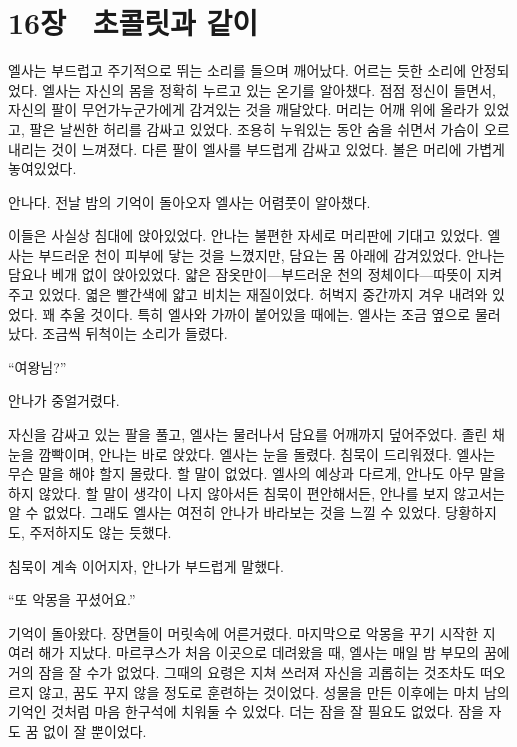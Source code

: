 ﻿

\chapter[16장  초콜릿과 같이][16장\hspace*{.5em}초콜릿과 같이]{16장 \ 초콜릿과 같이}



엘사는 부드럽고 주기적으로 뛰는 소리를 들으며 깨어났다. 어르는 듯한 소리에 안정되었다. 엘사는 자신의 몸을 정확히 누르고 있는 온기를 알아챘다. 점점 정신이 들면서, 자신의 팔이 무언가 누군가에게 감겨있는 것을 깨달았다. 머리는 어깨 위에 올라가 있었고, 팔은 날씬한 허리를 감싸고 있었다. 조용히 누워있는 동안 숨을 쉬면서 가슴이 오르내리는 것이 느껴졌다. 다른 팔이 엘사를 부드럽게 감싸고 있었다. 볼은 머리에 가볍게 놓여있었다.

안나다. 전날 밤의 기억이 돌아오자 엘사는 어렴풋이 알아챘다.

이들은 사실상 침대에 앉아있었다. 안나는 불편한 자세로 머리판에 기대고 있었다. 엘사는 부드러운 천이 피부에 닿는 것을 느꼈지만, 담요는 몸 아래에 감겨있었다. 안나는 담요나 베개 없이 앉아있었다. 얇은 잠옷만이—부드러운 천의 정체이다—따뜻이 지켜주고 있었다. 엷은 빨간색에 얇고 비치는 재질이었다. 허벅지 중간까지 겨우 내려와 있었다. 꽤 추울 것이다. 특히 엘사와 가까이 붙어있을 때에는. 엘사는 조금 옆으로 물러났다. 조금씩 뒤척이는 소리가 들렸다.

``여왕님?''

안나가 중얼거렸다.

자신을 감싸고 있는 팔을 풀고, 엘사는 물러나서 담요를 어깨까지 덮어주었다. 졸린 채 눈을 깜빡이며, 안나는 바로 앉았다. 엘사는 눈을 돌렸다. 침묵이 드리워졌다. 엘사는 무슨 말을 해야 할지 몰랐다. 할 말이 없었다. 엘사의 예상과 다르게, 안나도 아무 말을 하지 않았다. 할 말이 생각이 나지 않아서든 침묵이 편안해서든, 안나를 보지 않고서는 알 수 없었다. 그래도 엘사는 여전히 안나가 바라보는 것을 느낄 수 있었다. 당황하지도, 주저하지도 않는 듯했다.

침묵이 계속 이어지자, 안나가 부드럽게 말했다.

``또 악몽을 꾸셨어요.''

기억이 돌아왔다. 장면들이 머릿속에 어른거렸다. 마지막으로 악몽을 꾸기 시작한 지 여러 해가 지났다. 마르쿠스가 처음 이곳으로 데려왔을 때, 엘사는 매일 밤 부모의 꿈에 거의 잠을 잘 수가 없었다. 그때의 요령은 지쳐 쓰러져 자신을 괴롭히는 것조차도 떠오르지 않고, 꿈도 꾸지 않을 정도로 훈련하는 것이었다. 성물을 만든 이후에는 마치 남의 기억인 것처럼 마음 한구석에 치워둘 수 있었다. 더는 잠을 잘 필요도 없었다. 잠을 자도 꿈 없이 잘 뿐이었다.

